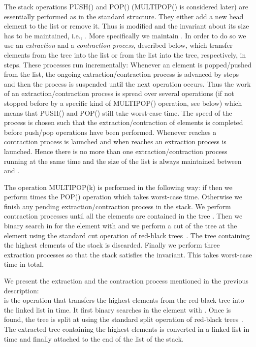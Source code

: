 \documentclass[letterpaper,11pt]{article}
\begin{document}
The stack operations {P{\scriptsize USH}()} and {P{\scriptsize OP}()} ({M{\scriptsize ULTIPOP}()} is considered later) are essentially performed as in the standard structure. They either add a new head element to the list  or remove it. Thus  is modified and the invariant about its size has to be maintained, i.e., . More specifically we maintain . In order to do so we use an \emph{extraction} and a \emph{contraction  process}, described below, which transfer  elements from the tree into the list or from the list into the tree, respectively, in  steps. These processes run incrementally: Whenever an element is popped/pushed from the list, the ongoing extraction/contraction process is advanced by  steps and then the process is suspended until the next operation occurs. Thus the work of an extraction/contraction process is spread over several operations (if not stopped before by a specific kind of {M{\scriptsize ULTIPOP}()} operation, see below) which means that {P{\scriptsize USH}()} and {P{\scriptsize OP}()} still take  worst-case time. The speed of the process is chosen such that the extraction/contraction of  elements is completed before  push/pop operations have been performed. Whenever  reaches  a contraction process is launched and when  reaches  an extraction process is launched. Hence there is no more than one extraction/contraction process running at the same time and the size of the list is always maintained between  and . 

The operation {M{\scriptsize ULTIPOP}(k)} is performed in the following way: if  then we perform  times the {P{\scriptsize OP}()} operation which takes  worst-case time. Otherwise we finish any pending extraction/contraction process in the stack. We perform  contraction processes until all the elements are contained in the tree . Then we binary search in  for the element  with  and we perform a cut of the tree at the element  using the standard cut operation of red-black trees~\cite{redblack}. The tree containing the  highest elements of the stack is discarded. Finally we perform three extraction processes so that the stack satisfies the invariant. This takes  worst-case time in total.

We present the extraction and the contraction process mentioned in the previous description: \\

 is the operation that transfers the  highest elements from the red-black tree into the linked list in  time. It first binary searches in  the element  with . Once  is found, the tree  is split at  using the standard split operation of red-black trees~\cite{redblack}. The extracted tree containing the highest elements is converted in a linked list in  time and finally attached to the end of the list of the stack. \\
\end{document}
